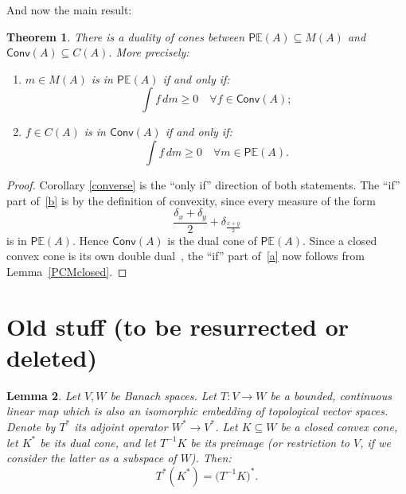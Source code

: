 \documentclass[a4paper,12pt]{scrartcl}
\numberwithin{equation}{section}
\theoremstyle{plain}
\newtheorem{thm}{Theorem}[subsection]
\newtheorem{lemma}[thm]{Lemma}
\theoremstyle{definition}
\DeclareMathOperator{\1}{\mathbbm{1}}
\DeclareMathOperator{\2}{\mathbbm{2}}
\newcommand{\E}{\mathbb{E}}
\newcommand{\Conv}{\mathsf{Conv}} %
\newcommand{\PCM}{\mathsf{P}\E} %
\begin{document}
And now the main result:

\begin{thm}
\label{main}
 There is a duality of cones between $\PCM(A)\subseteq M(A)$ and $\Conv(A)\subseteq C(A)$. More precisely:
 \begin{enumerate}
  \item\label{a} $m\in M(A)$ is in $\PCM(A)$ if and only if:
  \begin{equation}
   \int f \, dm \ge 0 \quad \forall f\in\Conv(A) ;
  \end{equation}
\item\label{b} $f\in C(A)$ is in $\Conv(A)$ if and only if:
  \begin{equation}
   \int f \, dm \ge 0 \quad \forall m\in\PCM(A) .
  \end{equation}
 \end{enumerate}
\end{thm}

\begin{proof}
Corollary \ref{converse} is the ``only if'' direction of both statements. The ``if'' part of~\ref{b} is by the definition of convexity, since every measure of the form
\[
	\frac{\delta_x + \delta_y}{2} + \delta_{\frac{x+y}{2}}
\]
is in $\PCM(A)$. Hence $\Conv(A)$ is the dual cone of $\PCM(A)$. Since a closed convex cone is its own double dual~\cite[Theorem~3.44]{conesduality}, the ``if'' part of~\ref{a} now follows from Lemma~\ref{PCMclosed}.
\end{proof}



\appendix

\section{Old stuff (to be resurrected or deleted)}

\begin{lemma}\label{dualcone}
 Let $V,W$ be Banach spaces. Let $T:V\to W$ be a bounded, continuous linear map which is also an isomorphic embedding of topological vector spaces. 
 Denote by $T^*$ its adjoint operator $W^*\to V^*$.
 Let $K\subseteq W$ be a closed convex cone, let $K^*$ be its dual cone, and let $T^{-1}K$ be its preimage (or restriction to $V$, if we consider the latter as a subspace of $W$).
 Then:
 \begin{equation}\label{TKTK}
  T^*(K^*) = \big( T^{-1}K \big)^*.
 \end{equation}
\end{lemma}
\end{document}
